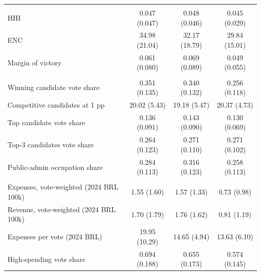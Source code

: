 \begin{table}[H]
\begin{tabular}{@{}lccc@{}}
\addlinespace[2pt]\multicolumn{4}{@{}l}{\emph{Electoral competition}} \\
HHI & 0.047 (0.047) & 0.048 (0.046) & 0.045 (0.029) \\
ENC & 34.98 (21.04) & 32.17 (18.79) & 29.84 (15.01) \\
Margin of victory & 0.061 (0.080) & 0.069 (0.089) & 0.049 (0.055) \\
\addlinespace[2pt]\multicolumn{4}{@{}l}{\emph{Candidate selection}} \\
Winning candidate vote share & 0.351 (0.135) & 0.340 (0.132) & 0.256 (0.118) \\
Competitive candidates at 1 pp & 20.02 (5.43) & 19.18 (5.47) & 20.37 (4.73) \\
Top candidate vote share & 0.136 (0.091) & 0.143 (0.090) & 0.130 (0.069) \\
Top-3 candidates vote share & 0.264 (0.123) & 0.271 (0.110) & 0.271 (0.102) \\
Public-admin occupation share & 0.284 (0.113) & 0.316 (0.123) & 0.258 (0.113) \\
\addlinespace[2pt]\multicolumn{4}{@{}l}{\emph{Campaign finance}} \\
Expenses, vote-weighted (2024 BRL 100k) & 1.55 (1.60) & 1.57 (1.33) & 0.73 (0.98) \\
Revenue, vote-weighted (2024 BRL 100k) & 1.70 (1.79) & 1.76 (1.62) & 0.81 (1.19) \\
Expenses per vote (2024 BRL) & 19.95 (10.29) & 14.65 (4.94) & 13.63 (6.10) \\
High-spending vote share & 0.694 (0.188) & 0.655 (0.173) & 0.574 (0.145) \\
\bottomrule
\end{tabular}
\end{table}
